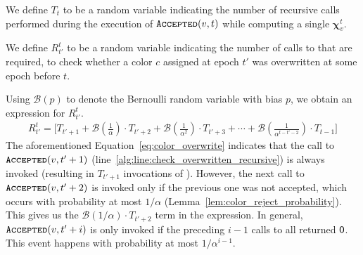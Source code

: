 \begin{definition}
\label{def:coloring_recursions}
We define $T_t$ to be a random variable indicating the number of recursive calls performed during the execution of $\texttt{\textsc{Accepted}}(v,t)$
while computing a single $\bm \chi_v^t$.
\end{definition}

\begin{definition}
\label{def:blah}
We define $R^t_{t'}$ to be a random variable indicating the number of calls to  that are required,
to check whether a color $c$ assigned at epoch $t'$ was overwritten at some epoch before $t$.
\end{definition}
Using $\mathcal B(p)$ to denote the Bernoulli random variable with bias $p$, we obtain an expression for $R^t_{t'}$.
\begin{align}
\label{eq:color_overwrite}
R^t_{t'} = \Biggl[T_{t'+1} + \mathcal B\left(\frac{1}{\alpha}\right)\cdot T_{t'+2}
+ \mathcal B\left(\frac{1}{\alpha^2}\right)\cdot T_{t'+3} + \cdots
+ \mathcal B\left(\frac{1}{\alpha^{t-t'-2}}\right)\cdot T_{t-1} \Biggr]
\end{align}
The aforementioned Equation~\ref{eq:color_overwrite} indicates that the call to $\texttt{\textsc{Accepted}}(v, t'+1)$
(line~\ref{alg:line:check_overwritten_recursive}) is always invoked (resulting in $T_{t'+1}$ invocations of ).
However, the next call to $\texttt{\textsc{Accepted}}(v, t'+2)$ is invoked only if the previous one was not accepted,
which occurs with probability at most $1/\alpha$ (Lemma~\ref{lem:color_reject_probability}).
This gives us the $\mathcal B(1/\alpha)\cdot T_{t'+2}$ term in the expression.
In general, $\texttt{\textsc{Accepted}}(v, t'+i)$ is only invoked if the preceding $i-1$ calls to  all returned $\mathsf{0}$.
This event happens with probability at most $1/\alpha^{i-1}$.

